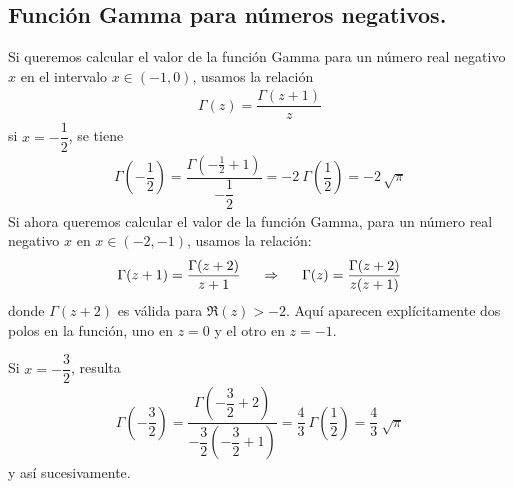 \subsection{Función Gamma para números negativos.}
Si queremos calcular el valor de la función Gamma para un número real negativo $x$ en el intervalo $x \in (-1, 0)$, usamos la relación
\begin{align*}
\Gamma (z) = \dfrac{\Gamma (z + 1)}{z}
\end{align*}
si  $x = - \dfrac{1}{2}$, se tiene
\begin{align*}
\Gamma \left( - \dfrac{1}{2} \right) = \dfrac{\Gamma \left( - \frac{1}{2} + 1 \right) }{- \dfrac{1}{2}} =  - 2 \: \Gamma \left( \dfrac{1}{2} \right) = - 2 \, \sqrt{\pi}
\end{align*}
Si ahora queremos calcular el valor de la función Gamma, para un número real negativo $x$ en $x \in (-2, -1)$, usamos la relación:
\begin{align*}
\Gamma (z + 1) = \dfrac{\Gamma (z + 2)}{z + 1} \hspace{0.5cm} \Rightarrow \hspace{0.5cm} \Gamma (z) = \dfrac{\Gamma (z + 2)}{z (z + 1)}
\end{align*}
donde $\Gamma (z + 2) $ es válida para $\Re(z) > -2$. Aquí aparecen explícitamente dos polos en la función, uno en $z=0$ y el otro en $z=-1$.
\par
Si $x = - \dfrac{3}{2}$, resulta
\begin{align*}
\Gamma \left( - \dfrac{3}{2} \right) = \dfrac{\Gamma \left( - \dfrac{3}{2} + 2 \right) }{- \dfrac{3}{2} \left( - \dfrac{3}{2} + 1 \right)} =  \dfrac{4}{3} \: \Gamma \left( \dfrac{1}{2} \right) = \dfrac{4}{3} \: \sqrt{\pi}
\end{align*}
y así sucesivamente.
